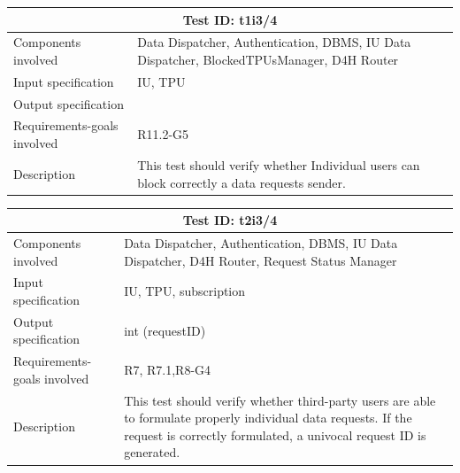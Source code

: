 \begin{table}[H]
\centering
\begin{tabular}{ |p{4.5cm}||p{11cm}|  }
 \hline
 \multicolumn{2}{|c|}{Test ID: t1i3/4} \\
 
 \hline 
 Components involved  	&    Data Dispatcher, Authentication, DBMS, IU Data Dispatcher, BlockedTPUsManager, D4H Router\\
 Input specification  	&  	 IU, TPU\\
Output specification  	& 	  	\\
Requirements-goals involved &  R11.2-G5\\
Description  	& 	 	   This test should verify whether Individual users can block correctly a data requests sender. \\
 \hline
\end{tabular}
\end{table}
\begin{table}[H]
\centering
\begin{tabular}{ |p{4.5cm}||p{11cm}|  }
 \hline
 \multicolumn{2}{|c|}{Test ID: t2i3/4} \\
 
 \hline 
 Components involved  	&    Data Dispatcher, Authentication, DBMS, IU Data Dispatcher, D4H Router, Request Status Manager\\
 Input specification  	&  	 IU, TPU, subscription\\
Output specification  	& 	  	int (requestID)\\
Requirements-goals involved &  R7, R7.1,R8-G4\\
Description  	& 	 	   This test should verify whether third-party users are able to formulate properly individual data requests. If the request is correctly formulated, a univocal request ID is generated. \\
 \hline
\end{tabular}
\end{table}
